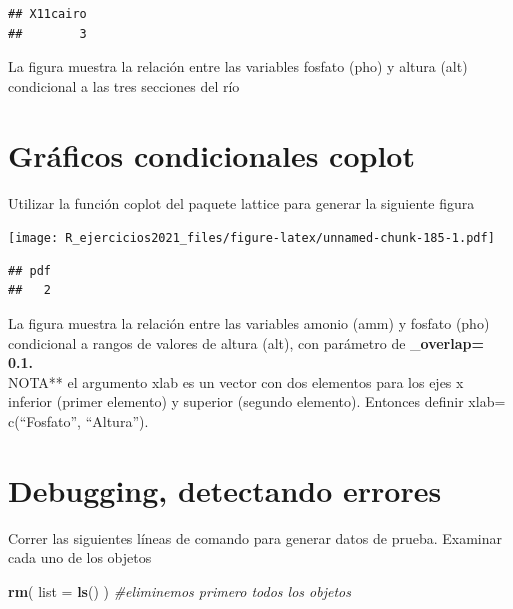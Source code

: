 \documentclass[]{book}
\newenvironment{Shaded}{\begin{snugshade}}{\end{snugshade}}
\newcommand{\CommentTok}[1]{\textcolor[rgb]{0.56,0.35,0.01}{\textit{#1}}}
\newcommand{\DataTypeTok}[1]{\textcolor[rgb]{0.13,0.29,0.53}{#1}}
\newcommand{\KeywordTok}[1]{\textcolor[rgb]{0.13,0.29,0.53}{\textbf{#1}}}
\newcommand{\NormalTok}[1]{#1}
\begin{document}
\begin{verbatim}
## X11cairo 
##        3
\end{verbatim}

La figura muestra la relación entre las variables fosfato (pho) y altura (alt) condicional a las tres secciones del río

\hypertarget{gruxe1ficos-condicionales-coplot}{%
\section{Gráficos condicionales coplot}\label{gruxe1ficos-condicionales-coplot}}

Utilizar la función coplot del paquete lattice para generar la siguiente figura

\texttt{[image: R\_ejercicios2021\_files/figure-latex/unnamed-chunk-185-1.pdf]}

\begin{verbatim}
## pdf 
##   2
\end{verbatim}

La figura muestra la relación entre las variables amonio (amm) y fosfato (pho) condicional a rangos de valores de altura (alt), con parámetro de \_\textbf{overlap= 0.1.\\
}NOTA** el argumento xlab es un vector con dos elementos para los ejes x inferior (primer elemento) y superior (segundo elemento). Entonces definir xlab= c(``Fosfato'', ``Altura'').

\hypertarget{debugging-detectando-errores-5}{%
\section{Debugging, detectando errores}\label{debugging-detectando-errores-5}}

Correr las siguientes líneas de comando para generar datos de prueba. Examinar cada uno de los objetos

\begin{Shaded}
\begin{Highlighting}[]
\KeywordTok{rm}\NormalTok{( }\DataTypeTok{list =} \KeywordTok{ls}\NormalTok{() ) }\CommentTok{#eliminemos primero todos los objetos}
\end{Highlighting}
\end{Shaded}
\end{document}
